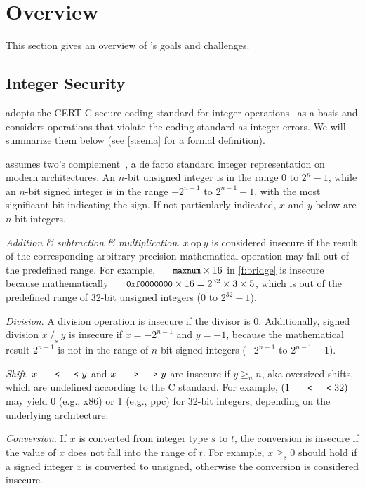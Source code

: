 \section{Overview}
\label{s:oview}

This section gives an overview of \sys's goals and challenges.

\subsection{Integer Security}

\sys adopts the CERT C secure coding standard for integer
operations~\cite[Ch.~5]{seacord:secure-c} as a basis and considers
operations that violate the coding standard as integer errors.  We
will summarize them below (see \autoref{s:sema} for a formal
definition).

\sys assumes two's complement~\cite[Ch.~4.2.1]{intel:vol1}, a de
facto standard integer representation on modern architectures.  An
$n$-bit unsigned integer is in the range $0$ to $2^n-1$, while an
$n$-bit signed integer is in the range $-2^{n-1}$ to $2^{n-1}-1$,
with the most significant bit indicating the sign.  If not particularly
indicated, $x$ and $y$ below are $n$-bit integers.

\noindent
{\it Addition \& subtraction \& multiplication}.
$x\ \textrm{op}\ y$ is considered insecure if the result of the
corresponding arbitrary-precision mathematical operation may fall
out of the predefined range.  For example, $\cc{maxnum}\times
16$ in \autoref{f:bridge} is insecure because mathematically
$\cc{0xf0000000} \times 16 = 2^{32}\times 3\times 5$, which is out
of the predefined range of $32$-bit unsigned integers ($0$ to $2^{32}
- 1$).

\noindent
{\it Division}.
A division operation is insecure if the divisor is 0.  Additionally,
signed division $x\ /_s\ y$ is insecure if $x = -2^{n-1}$ and $y =
-1$, because the mathematical result $2^{n-1}$ is not in the range
of $n$-bit signed integers ($-2^{n-1}$ to $2^{n-1}-1$).

\noindent
{\it Shift}. $x \shl y$ and $x \shr y$ are insecure if $y \geq_u
n$, aka oversized shifts, which are undefined according to the C
standard.  For example, $(1 \shl 32)$ may yield 0 (e.g., x86) or 1
(e.g., ppc) for 32-bit integers, depending on the underlying
architecture.

\noindent
{\it Conversion}.
If $x$ is converted from integer type $s$ to $t$, the conversion
is insecure if the value of $x$ does not fall into the range of
$t$.  For example, $x \geq_s 0$ should hold if a signed integer $x$
is converted to unsigned, otherwise the conversion is considered
insecure.

